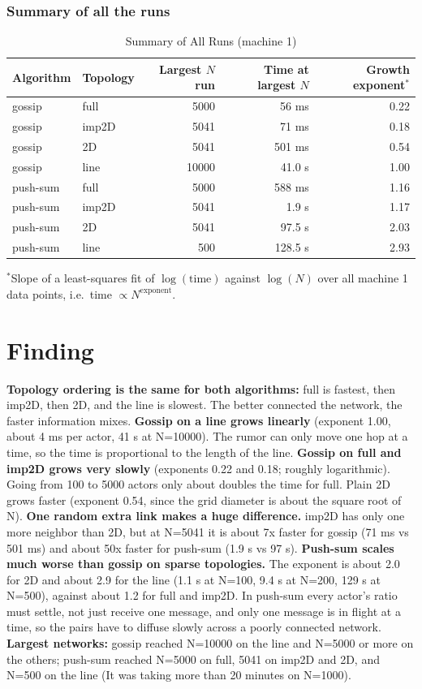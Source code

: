 \documentclass[conference]{styles/acmsiggraph}
\begin{document}
\subsubsection*{Summary of all the runs}
\begin{table}[H]
\centering
\begin{tabular}{llrrr}
\toprule
Algorithm & Topology & Largest $N$ run & Time at largest $N$ & Growth exponent$^{*}$ \\
\midrule
gossip   & full  & 5000  & 56 ms    & 0.22 \\
gossip   & imp2D & 5041  & 71 ms    & 0.18 \\
gossip   & 2D    & 5041  & 501 ms   & 0.54 \\
gossip   & line  & 10000 & 41.0 s   & 1.00 \\
\midrule
push-sum & full  & 5000  & 588 ms   & 1.16 \\
push-sum & imp2D & 5041  & 1.9 s    & 1.17 \\
push-sum & 2D    & 5041  & 97.5 s   & 2.03 \\
push-sum & line  & 500   & 128.5 s  & 2.93 \\
\bottomrule
\end{tabular}

\vspace{1ex}
{\footnotesize $^{*}$Slope of a least-squares fit of $\log(\mathrm{time})$ against $\log(N)$ over all machine 1 data points, i.e.\ time $\propto N^{\mathrm{exponent}}$.}
\caption{Summary of All Runs (machine 1)}
\end{table}


\section{Finding}
\textbf{Topology ordering is the same for both algorithms:} full is fastest, then imp2D, then 2D, and the line is
slowest. The better connected the network, the faster information mixes.
\textbf{Gossip on a line grows linearly} (exponent 1.00, about 4 ms per actor, 41 s at N=10000). The rumor can
only move one hop at a time, so the time is proportional to the length of the line.
\textbf{Gossip on full and imp2D grows very slowly} (exponents 0.22 and 0.18; roughly logarithmic). Going
from 100 to 5000 actors only about doubles the time for full. Plain 2D grows faster (exponent 0.54, since
the grid diameter is about the square root of N).
\textbf{One random extra link makes a huge difference.} imp2D has only one more neighbor than 2D, but at
N=5041 it is about 7x faster for gossip (71 ms vs 501 ms) and about 50x faster for push-sum (1.9 s vs 97
s).
\textbf{Push-sum scales much worse than gossip on sparse topologies.} The exponent is about 2.0 for 2D
and about 2.9 for the line (1.1 s at N=100, 9.4 s at N=200, 129 s at N=500), against about 1.2 for full and
imp2D. In push-sum every actor's ratio must settle, not just receive one message, and only one message
is in flight at a time, so the pairs have to diffuse slowly across a poorly connected network.
\textbf{Largest networks:} gossip reached N=10000 on the line and N=5000 or more on the others; push-sum
reached N=5000 on full, 5041 on imp2D and 2D, and N=500 on the line (It was taking more than 20 minutes on N=1000).
\end{document}
